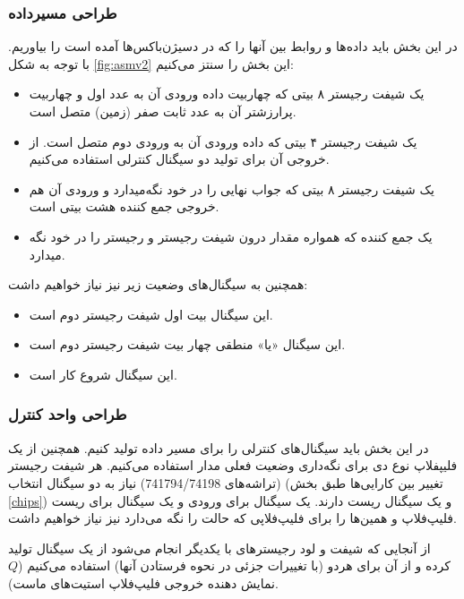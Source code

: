 \documentclass{article}
\begin{document}
\subsubsection{طراحی مسیرداده}
در این بخش باید داده‌ها و روابط بین آنها را که در دسیژن‌باکس‌ها آمده است را بیاوریم. با توجه به شکل \ref{fig:asmv2} این بخش را سنتز می‌کنیم:

\begin{itemize}
\item[\lr{A}]
یک شیفت رجیستر ۸ بیتی که چهاربیت داده ورودی آن به عدد اول و چهاربیت پرارزشتر آن به عدد ثابت صفر (زمین) متصل است.
\item[\lr{B}]
یک شیفت رجیستر ۴ بیتی که داده ورودی آن به ورودی دوم متصل است. از خروجی آن برای تولید دو سیگنال کنترلی استفاده می‌کنیم.
\item[\lr{C}]
یک شیفت رجیستر ۸ بیتی که جواب نهایی را در خود نگه‌میدارد و ورودی آن هم خروجی جمع کننده هشت بیتی است.
\item
یک جمع کننده که همواره مقدار درون شیفت رجیستر  و رجیستر  را در خود نگه میدارد.

\end{itemize}

همچنین به سیگنال‌های وضعیت زیر نیز نیاز خواهیم داشت:

\begin{itemize}
\item[\lr{B0}]
این سیگنال بیت اول شیفت رجیستر دوم است.
\item[\lr{ORB}]
این سیگنال «یا» منطقی چهار بیت شیفت رجیستر دوم است.
\item[\lr{S}]
این سیگنال شروع کار است.
\end{itemize}

\subsubsection{طراحی واحد کنترل}
در این بخش باید سیگنال‌های کنترلی را برای مسیر داده تولید کنیم. همچنین از یک فلیپفلاپ نوع دی برای نگه‌داری وضعیت فعلی مدار استفاده می‌کنیم. هر شیفت رجیستر (تراشه‌های 741794/74198) نیاز به دو سیگنال انتخاب (تغییر بین کارایی‌ها طبق بخش \ref{chips}) و یک سیگنال ریست دارند. یک سیگنال برای ورودی و یک سیگنال برای ریست فلیپ‌فلاپ  و همین‌ها را برای فلیپ‌فلاپی که حالت را نگه می‌دارد نیز نیاز خواهیم داشت. 

از آنجایی که شیفت و لود رجیسترهای  با یکدیگر انجام می‌شود از یک سیگنال تولید کرده و از آن برای هردو (با تغییرات جزئی در نحوه فرستادن آنها) استفاده می‌کنیم ($Q$ نمایش دهنده خروجی فلیپ‌فلاپ استیت‌های ماست).
\end{document}
